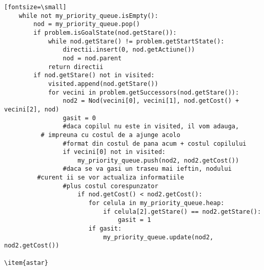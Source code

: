 \begin{verbatim}[fontsize=\small]
    while not my_priority_queue.isEmpty():
        nod = my_priority_queue.pop()
        if problem.isGoalState(nod.getStare()):
            while nod.getStare() != problem.getStartState():
                directii.insert(0, nod.getActiune())
                nod = nod.parent
            return directii
        if nod.getStare() not in visited:
            visited.append(nod.getStare())
            for vecini in problem.getSuccessors(nod.getStare()):
                nod2 = Nod(vecini[0], vecini[1], nod.getCost() + vecini[2], nod)
                gasit = 0
                #daca copilul nu este in visited, il vom adauga,
	      # impreuna cu costul de a ajunge acolo
                #format din costul de pana acum + costul copilului
                if vecini[0] not in visited:
                    my_priority_queue.push(nod2, nod2.getCost())
                #daca se va gasi un traseu mai ieftin, nodului 
	     #curent ii se vor actualiza informatiile
                #plus costul corespunzator
                    if nod.getCost() < nod2.getCost():
                       for celula in my_priority_queue.heap:
                           if celula[2].getStare() == nod2.getStare():
                               gasit = 1
                       if gasit:
                           my_priority_queue.update(nod2, nod2.getCost())

\item{astar}


\end{verbatim}
